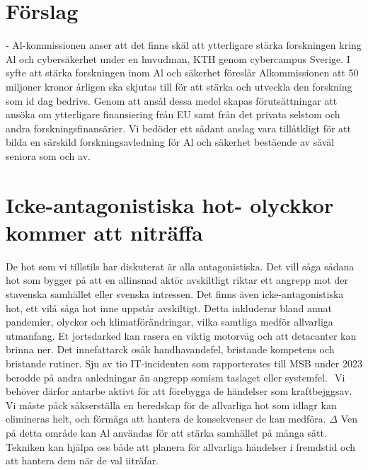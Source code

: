 {{{{{{{{\section*{Förslag}
- Al-kommissionen anser att det finns skäl att ytterligare stärka forskningen kring Al och cybersäkerhet under en huvudman, KTH genom cybercampus Sverige. I syfte att stärka forskningen inom Al och säkerhet föreslår Alkommissionen att 50 miljoner kronor årligen ska skjutas till för att stärka och utveckla den forskning som id dag bedrivs. Genom att ansål dessa medel skapas förutsättningar att ansöka om ytterligare finansiering från EU samt från det privata selstom och andra forskningsfinansärier. Vi bedöder ett sådant anslag vara tillåtkligt för att bilda en särskild forskningsavledning för Al och säkerhet bestäende av såväl seniora som och av.
\section*{Icke-antagonistiska hot- olyckkor kommer att niträffa}
De hot som vi tillstils har diskuterat är alla antagonistiska. Det vill såga sådana hot som bygger på att en allinsnad aktör avskiltligt riktar ett angrepp mot der stavenska samhället eller svenska intressen. Det finns även icke-antagonistiska hot, ett vilå såga hot inne uppstår avskiltigt. Detta inkluderar bland annat pandemier, olyckor och klimatförändringar, vilka samtliga medför allvarliga utmanfang. Et jortsdarked kan rasera en viktig motorväg och att detacanter kan brinna ner. Det innefattarck osåk handhavandefel, bristande kompetens och bristande rutiner. Sju av tio IT-incidenten som rapporterates till MSB under 2023 berodde på andra anledningar än angrepp somism taslaget eller systemfel. \({ }^{}\) Vi behöver därfor antarbe aktivt för att förebygga de händelser som kraftbejggsav. Vi måste påck såkserställa en beredskap för de allvarliga hot som idlagr kan elimineras helt, och förmåga att hantera de konsekvenser de kan medföra.
\(\Delta\) Ven på detta område kan Al användas för att stärka samhället på många sätt. Tekniken kan hjälpa oss både att planera för allvarliga händelser i fremdstid och att hantera dem när de val iiträfar.

}}}}}}}}
